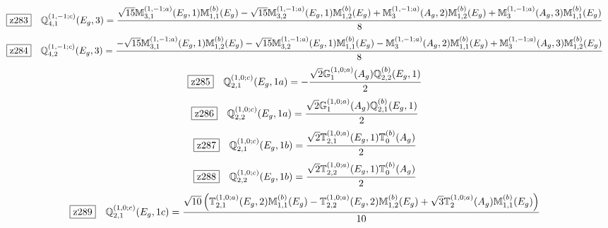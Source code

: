 \documentclass[fleqn,10pt,landscape]{jsarticle}
\begin{document}
\begin{dmath*}
\hspace*{3mm}\fbox{z283}\quad \mathbb{Q}_{4,1}^{(1,-1;c)}(E_{g},3)=\frac{\sqrt{15} \mathbb{M}_{3,1}^{(1,-1;a)}(E_{g},1) \mathbb{M}_{1,1}^{(b)}(E_{g}) - \sqrt{15} \mathbb{M}_{3,2}^{(1,-1;a)}(E_{g},1) \mathbb{M}_{1,2}^{(b)}(E_{g}) + \mathbb{M}_{3}^{(1,-1;a)}(A_{g},2) \mathbb{M}_{1,2}^{(b)}(E_{g}) + \mathbb{M}_{3}^{(1,-1;a)}(A_{g},3) \mathbb{M}_{1,1}^{(b)}(E_{g})}{8}
\end{dmath*}
\begin{dmath*}
\hspace*{3mm}\fbox{z284}\quad \mathbb{Q}_{4,2}^{(1,-1;c)}(E_{g},3)=\frac{- \sqrt{15} \mathbb{M}_{3,1}^{(1,-1;a)}(E_{g},1) \mathbb{M}_{1,2}^{(b)}(E_{g}) - \sqrt{15} \mathbb{M}_{3,2}^{(1,-1;a)}(E_{g},1) \mathbb{M}_{1,1}^{(b)}(E_{g}) - \mathbb{M}_{3}^{(1,-1;a)}(A_{g},2) \mathbb{M}_{1,1}^{(b)}(E_{g}) + \mathbb{M}_{3}^{(1,-1;a)}(A_{g},3) \mathbb{M}_{1,2}^{(b)}(E_{g})}{8}
\end{dmath*}
\begin{dmath*}
\hspace*{3mm}\fbox{z285}\quad \mathbb{Q}_{2,1}^{(1,0;c)}(E_{g},1a)=- \frac{\sqrt{2} \mathbb{G}_{1}^{(1,0;a)}(A_{g}) \mathbb{Q}_{2,2}^{(b)}(E_{g},1)}{2}
\end{dmath*}
\begin{dmath*}
\hspace*{3mm}\fbox{z286}\quad \mathbb{Q}_{2,2}^{(1,0;c)}(E_{g},1a)=\frac{\sqrt{2} \mathbb{G}_{1}^{(1,0;a)}(A_{g}) \mathbb{Q}_{2,1}^{(b)}(E_{g},1)}{2}
\end{dmath*}
\begin{dmath*}
\hspace*{3mm}\fbox{z287}\quad \mathbb{Q}_{2,1}^{(1,0;c)}(E_{g},1b)=\frac{\sqrt{2} \mathbb{T}_{2,1}^{(1,0;a)}(E_{g},1) \mathbb{T}_{0}^{(b)}(A_{g})}{2}
\end{dmath*}
\begin{dmath*}
\hspace*{3mm}\fbox{z288}\quad \mathbb{Q}_{2,2}^{(1,0;c)}(E_{g},1b)=\frac{\sqrt{2} \mathbb{T}_{2,2}^{(1,0;a)}(E_{g},1) \mathbb{T}_{0}^{(b)}(A_{g})}{2}
\end{dmath*}
\begin{dmath*}
\hspace*{3mm}\fbox{z289}\quad \mathbb{Q}_{2,1}^{(1,0;c)}(E_{g},1c)=\frac{\sqrt{10} \left(\mathbb{T}_{2,1}^{(1,0;a)}(E_{g},2) \mathbb{M}_{1,1}^{(b)}(E_{g}) - \mathbb{T}_{2,2}^{(1,0;a)}(E_{g},2) \mathbb{M}_{1,2}^{(b)}(E_{g}) + \sqrt{3} \mathbb{T}_{2}^{(1,0;a)}(A_{g}) \mathbb{M}_{1,1}^{(b)}(E_{g})\right)}{10}
\end{dmath*}
\end{document}
